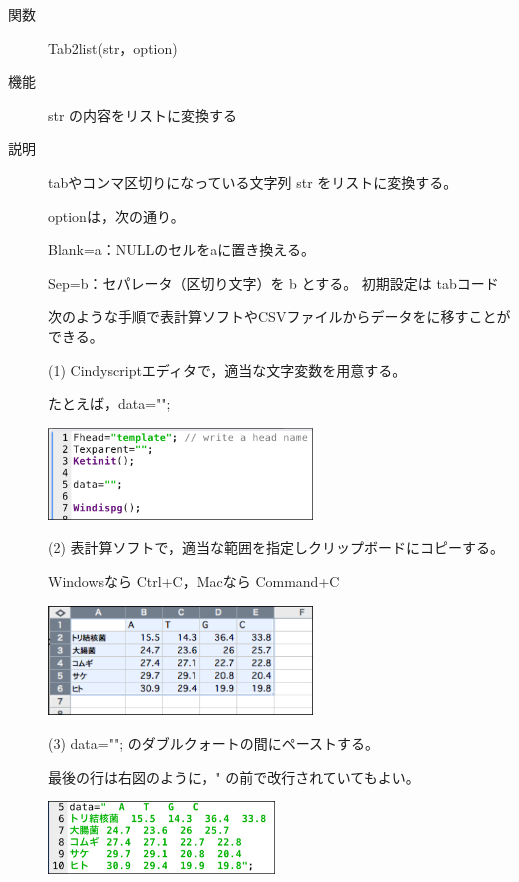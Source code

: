 \documentclass[papersize,a4paper,12pt,uplatex]{jsarticle}
\begin{document}
\begin{description}
\hypertarget{tab2list}{}
\item[関数]Tab2list(str，option)
\item[機能]str の内容をリストに変換する
\item[説明]tabやコンマ区切りになっている文字列 str をリストに変換する。

 optionは，次の通り。
 
 Blank=a：NULLのセルをaに置き換える。
 
Sep=b：セパレータ（区切り文字）を b とする。 初期設定は tabコード

次のような手順で表計算ソフトやCSVファイルからデータを\ketcindy に移すことができる。

\vspace{\baselineskip}
(1) Cindyscriptエディタで，適当な文字変数を用意する。

たとえば，data="";

\vspace{\baselineskip}
\hspace{10mm} \includegraphics[bb=0 0 429.02 149.01 , width=7cm]{Fig/tab2list02.pdf}

\vspace{\baselineskip}
(2) 表計算ソフトで，適当な範囲を指定しクリップボードにコピーする。

Windowsなら Ctrl+C，Macなら Command+C

\vspace{\baselineskip}
\hspace{10mm} \includegraphics[bb=0 0 371.02 154 , width=7cm]{Fig/tab2list01.pdf}

\vspace{\baselineskip}
(3) data=""; のダブルクォートの間にペーストする。

最後の行は右図のように，" の前で改行されていてもよい。

\vspace{\baselineskip}
\hspace{10mm} \includegraphics[bb=0 0 369.02 118.01 , width=6cm]{Fig/tab2list00.pdf}


\end{description}
\end{document}
